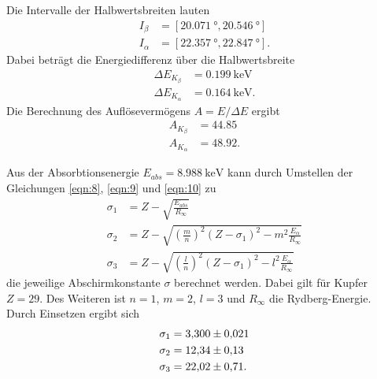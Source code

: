 \noindent
Die Intervalle der Halbwertsbreiten lauten 
\begin{align*}
    I_{\beta} &=[\SI{20.071}{\degree},\SI{20.546}{\degree}]\\
    I_{\alpha}&=[\SI{22.357}{\degree},\SI{22.847}{\degree}] .
\end{align*}
Dabei beträgt die Energiedifferenz über die Halbwertsbreite
\begin{align*}
    \Delta E_{K_\beta}  &= \SI{0.199}{\kilo\electronvolt}\\
    \Delta E_{K_\alpha} &= \SI{0.164}{\kilo\electronvolt}   .
\end{align*}
Die Berechnung des Auflösevermögens $A=E/\Delta E$ ergibt
\begin{align*}
    A_{K_\beta}  &= \num{44.85}\\
    A_{K_\alpha} &= \num{48.92} .
\end{align*}

Aus der Absorbtionsenergie $E_{abs}=\SI{8.988}{\kilo\electronvolt}$ \cite{AP04} kann durch Umstellen der Gleichungen \eqref{eqn:8}, \eqref{eqn:9}
und \eqref{eqn:10} zu
\begin{align*}
    \sigma_1&=Z-\sqrt{\frac{E_{abs}}{R_\infty}}\\
    \sigma_2&=Z-\sqrt{\left(\frac{m}{n}\right)^2(Z-\sigma_1)^2-m^2\frac{E_\alpha}{R_\infty}}\\
    \sigma_3&=Z-\sqrt{\left(\frac{l}{n}\right)^2(Z-\sigma_1)^2-l^2\frac{E_\alpha}{R_\infty}}
\end{align*}
die jeweilige Abschirmkonstante $\sigma$ berechnet werden. Dabei gilt für Kupfer $Z=\num{29}$. Des Weiteren ist $n=1$, $m=2$, $l=3$
und $R_\infty$ die Rydberg-Energie. Durch Einsetzen ergibt sich
\begin{align*}
    \sigma_1&=\num{3.30  \pm 0.021}\\
    \sigma_2&=\num{12.34 \pm 0.13 }\\
    \sigma_3&=\num{22.02 \pm 0.71 }   .
\end{align*}

